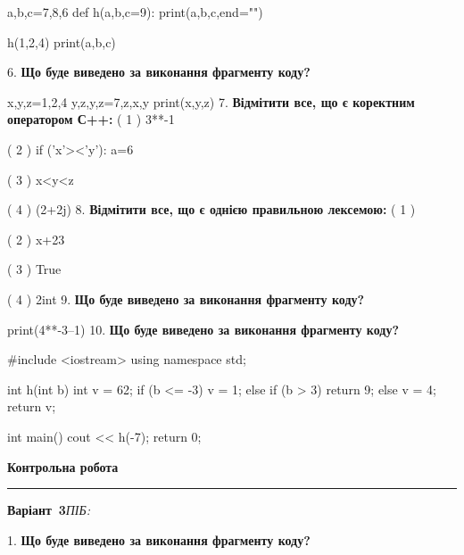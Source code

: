 \documentclass[11pt]{article}
\begin{document}
a,b,c=7,8,6
def h(a,b,c=9):
    print(a,b,c,end="")

h(1,2,4)
print(a,b,c)

\vspace{5mm}
6. \textbf{Що буде виведено за виконання фрагменту коду?}

x,y,z=1,2,4
y,z,y,z=7,z,x,y
print(x,y,z)
\vspace{5mm}
7. %
\textbf{Відмітити все, що є коректним оператором С++:}
( 1 ) 3**-1

( 2 ) if ('x'><'y'): a=6

( 3 ) x<y<z

( 4 ) (2+2j)%
\vspace{5mm}
8. %
\textbf{Відмітити все, що є однією правильною лексемою:}
( 1 ) %

( 2 ) x+23

( 3 ) True

( 4 ) 2int
\vspace{5mm}
9. \textbf{Що буде виведено за виконання фрагменту коду?}

print(4**-3--1)
\vspace{5mm}
10. \textbf{Що буде виведено за виконання фрагменту коду?}

#include <iostream>
using namespace std;

int h(int b){
    int v = 62;
    if (b <= -3) 
        v = 1;
    else if (b > 3)
         return 9;
    else
         v = 4;
    return v;
}

int main(){
    cout << h(-7);
    return 0;
}

\vspace{5mm}










\newpage

\newpage

{\centering\Large\bfseries Контрольна робота\par}
\medskip
\noindent\rule{\linewidth}{0.5pt}
\smallskip
\noindent\textbf{Варіант \No\,3}\hfill \textit{ПІБ:}\,\underline{\hspace{60mm}}
\vspace{4mm}

1. \textbf{Що буде виведено за виконання фрагменту коду?}
\end{document}
